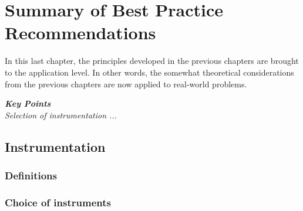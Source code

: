 \chapter{Summary of Best Practice Recommendations {\color{magenta}{Contributing author: }}}
\label{ch:bestpractice}

{\color{blue}{comment CM/SW: summary in form of lists and tables with link to previous subsections}}

\noindent{}

In this last chapter, the principles developed in the previous chapters are brought to the application level. In other words, the somewhat theoretical considerations from the previous chapters are now applied to real-world problems. 


\noindent\begin{tcolorbox}
\parbox{\textwidth}{
\emph{\textbf{Key Points}\\
Selection of instrumentation ...
}}
\end{tcolorbox}


\section{Instrumentation {\color{magenta}{Contributing author: }}}
 
    \subsection{Definitions }
 
    \subsection{Choice of instruments }
 
